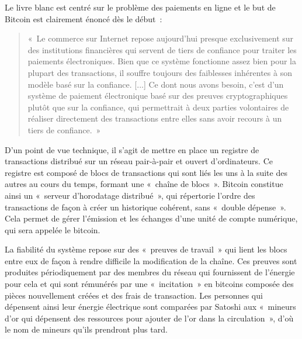 Le livre blanc est centré sur le problème des paiements en ligne et le but de Bitcoin est clairement énoncé dès le début~:

\begin{quote}
«~Le commerce sur Internet repose aujourd'hui presque exclusivement sur des institutions financières qui servent de tiers de confiance pour traiter les paiements électroniques. Bien que ce système fonctionne assez bien pour la plupart des transactions, il souffre toujours des faiblesses inhérentes à son modèle basé sur la confiance. [...] Ce dont nous avons besoin, c'est d'un système de paiement électronique basé sur des preuves cryptographiques plutôt que sur la confiance, qui permettrait à deux parties volontaires de réaliser directement des transactions entre elles sans avoir recours à un tiers de confiance.~»
\end{quote}



D'un point de vue technique, il s'agit de mettre en place un registre de transactions distribué sur un réseau pair-à-pair et ouvert d'ordinateurs. Ce registre est composé de blocs de transactions qui sont liés les uns à la suite des autres au cours du temps, formant une «~chaîne de blocs~». Bitcoin constitue ainsi un «~serveur d'horodatage distribué~», qui répertorie l'ordre des transactions de façon à créer un historique cohérent, sans «~double dépense~». Cela permet de gérer l'émission et les échanges d'une unité de compte numérique, qui sera appelée le bitcoin.

La fiabilité du système repose sur des «~preuves de travail~» qui lient les blocs entre eux de façon à rendre difficile la modification de la chaîne. Ces preuves sont produites périodiquement par des membres du réseau qui fournissent de l'énergie pour cela et qui sont rémunérés par une «~incitation~» en bitcoins composée des pièces nouvellement créées et des frais de transaction. Les personnes qui dépensent ainsi leur énergie électrique sont comparées par Satoshi aux «~mineurs d'or qui dépensent des ressources pour ajouter de l'or dans la circulation~», d'où le nom de mineurs qu'ils prendront plus tard.

